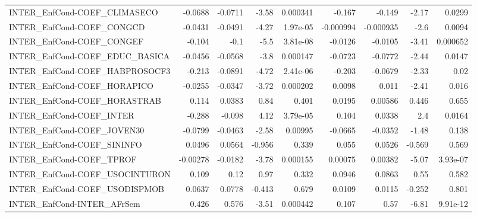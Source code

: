 \begin{tabular}{lrrrrrrrr}
INTER\_EnfCond-COEF\_CLIMASECO          &     -0.0688 &      -0.0711 &   -3.58 & 0.000341 &     -0.167 &      -0.149 &        -2.17 &        0.0299 \\
INTER\_EnfCond-COEF\_CONGCD             &     -0.0431 &      -0.0491 &   -4.27 & 1.97e-05 &  -0.000994 &   -0.000935 &         -2.6 &        0.0094 \\
INTER\_EnfCond-COEF\_CONGEF             &      -0.104 &         -0.1 &    -5.5 & 3.81e-08 &    -0.0126 &     -0.0105 &        -3.41 &      0.000652 \\
INTER\_EnfCond-COEF\_EDUC\_BASICA        &     -0.0456 &      -0.0568 &    -3.8 & 0.000147 &    -0.0723 &     -0.0772 &        -2.44 &        0.0147 \\
INTER\_EnfCond-COEF\_HABPROSOCF3        &      -0.213 &      -0.0891 &   -4.72 & 2.41e-06 &     -0.203 &     -0.0679 &        -2.33 &          0.02 \\
INTER\_EnfCond-COEF\_HORAPICO           &     -0.0255 &      -0.0347 &   -3.72 & 0.000202 &     0.0098 &       0.011 &        -2.41 &         0.016 \\
INTER\_EnfCond-COEF\_HORASTRAB          &       0.114 &       0.0383 &    0.84 &    0.401 &     0.0195 &     0.00586 &        0.446 &         0.655 \\
INTER\_EnfCond-COEF\_INTER              &      -0.288 &       -0.098 &    4.12 & 3.79e-05 &      0.104 &      0.0338 &          2.4 &        0.0164 \\
INTER\_EnfCond-COEF\_JOVEN30            &     -0.0799 &      -0.0463 &   -2.58 &  0.00995 &    -0.0665 &     -0.0352 &        -1.48 &         0.138 \\
INTER\_EnfCond-COEF\_SININFO            &      0.0496 &       0.0564 &  -0.956 &    0.339 &      0.055 &      0.0526 &       -0.569 &         0.569 \\
INTER\_EnfCond-COEF\_TPROF              &    -0.00278 &      -0.0182 &   -3.78 & 0.000155 &    0.00075 &     0.00382 &        -5.07 &      3.93e-07 \\
INTER\_EnfCond-COEF\_USOCINTURON        &       0.109 &         0.12 &    0.97 &    0.332 &     0.0946 &      0.0863 &         0.55 &         0.582 \\
INTER\_EnfCond-COEF\_USODISPMOB         &      0.0637 &       0.0778 &  -0.413 &    0.679 &     0.0109 &      0.0115 &       -0.252 &         0.801 \\
INTER\_EnfCond-INTER\_AFrSem            &       0.426 &        0.576 &   -3.51 & 0.000442 &      0.107 &        0.57 &        -6.81 &      9.91e-12 \\

\end{tabular}
